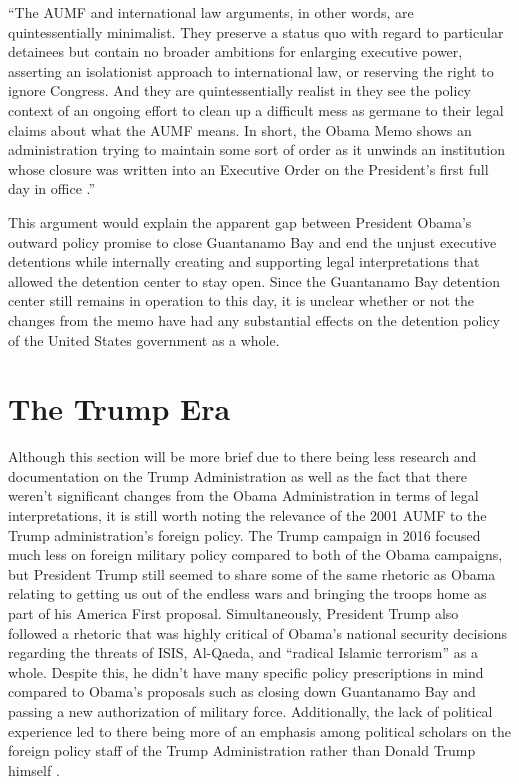 \documentclass[12pt]{article}
\begin{document}
\begin{displayquote}
``The AUMF and international law arguments, in other words, are quintessentially minimalist. They preserve a status quo with regard to particular detainees but contain no broader ambitions for enlarging executive power, asserting an isolationist approach to international law, or reserving the right to ignore Congress. And they are quintessentially realist in they see the policy context of an ongoing effort to clean up a difficult mess as germane to their legal claims about what the AUMF means. In short, the Obama Memo shows an administration trying to maintain some sort of order as it unwinds an institution whose closure was written into an Executive Order on the President’s first full day in office \autocite[48]{brill2010}.''
\end{displayquote}

\noindent
This argument would explain the apparent gap between President Obama's outward policy promise to close Guantanamo Bay and end the unjust executive detentions while internally creating and supporting legal interpretations that allowed the detention center to stay open.
Since the Guantanamo Bay detention center still remains in operation to this day, it is unclear whether or not the changes from the memo have had any substantial effects on the detention policy of the United States government as a whole.

\section*{The Trump Era}
Although this section will be more brief due to there being less research and documentation on the Trump Administration as well as the fact that there weren't significant changes from the Obama Administration in terms of legal interpretations, it is still worth noting the relevance of the 2001 AUMF to the Trump administration's foreign policy.
The Trump campaign in 2016 focused much less on foreign military policy compared to both of the Obama campaigns, but President Trump still seemed to share some of the same rhetoric as Obama relating to getting us out of the endless wars and bringing the troops home as part of his America First proposal.
Simultaneously, President Trump also followed a rhetoric that was highly critical of Obama's national security decisions regarding the threats of ISIS, Al-Qaeda, and ``radical Islamic terrorism'' as a whole.
Despite this, he didn't have many specific policy prescriptions in mind compared to Obama's proposals such as closing down Guantanamo Bay and passing a new authorization of military force.
Additionally, the lack of political experience led to there being more of an emphasis among political scholars on the foreign policy staff of the Trump Administration rather than Donald Trump himself \autocite[24]{starr-deelen2018}.
\end{document}

